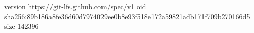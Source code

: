 version https://git-lfs.github.com/spec/v1
oid sha256:89b186a8fe36d60d7974029ee0b8e93f518e172a59821adb171f709b270166d5
size 142396
